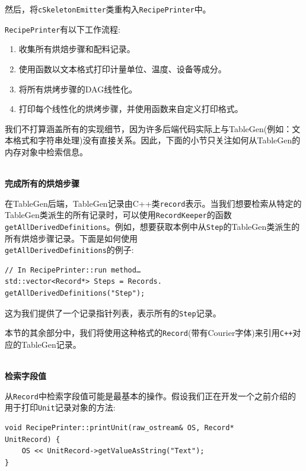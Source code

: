 然后，将\texttt{cSkeletonEmitter}类重构入\texttt{RecipePrinter}中。

\texttt{RecipePrinter}有以下工作流程:

\begin{enumerate}
\item 收集所有烘焙步骤和配料记录。
\item 使用函数以文本格式打印计量单位、温度、设备等成分。
\item 将所有烘烤步骤的DAG线性化。
\item 打印每个线性化的烘烤步骤，并使用函数来自定义打印格式。
\end{enumerate}

我们不打算涵盖所有的实现细节，因为许多后端代码实际上与TableGen(例如：文本格式和字符串处理)没有直接关系。因此，下面的小节只关注如何从TableGen的内存对象中检索信息。

\hspace*{\fill} \\ %
\noindent
\textbf{完成所有的烘焙步骤}

在TableGen后端，TableGen记录由C++类\texttt{record}表示。当我们想要检索从特定的TableGen类派生的所有记录时，可以使用\texttt{RecordKeeper}的函数\texttt{getAllDerivedDefinitions}。例如，想要获取本例中从\texttt{Step}的TableGen类派生的所有烘焙步骤记录。下面是如何使用\\\texttt{getAllDerivedDefinitions}的例子:

\begin{lstlisting}[style=styleCXX]
// In RecipePrinter::run method…
std::vector<Record*> Steps = Records.
getAllDerivedDefinitions("Step");
\end{lstlisting}

这为我们提供了一个记录指针列表，表示所有的\texttt{Step}记录。

\begin{tcolorbox}[colback=blue!5!white,colframe=blue!75!black, fonttitle=\bfseries,title=Note]
\hspace*{0.7cm}本节的其余部分中，我们将使用这种格式的\texttt{Record}(带有Courier字体)来引用\texttt{C++}对应的TableGen记录。
\end{tcolorbox}

\hspace*{\fill} \\ %
\noindent
\textbf{检索字段值}

从\texttt{Record}中检索字段值可能是最基本的操作。假设我们正在开发一个之前介绍的用于打印\texttt{Unit}记录对象的方法:

\begin{lstlisting}[style=styleCXX]
void RecipePrinter::printUnit(raw_ostream& OS, Record*
UnitRecord) {
	OS << UnitRecord->getValueAsString("Text");
}
\end{lstlisting}

